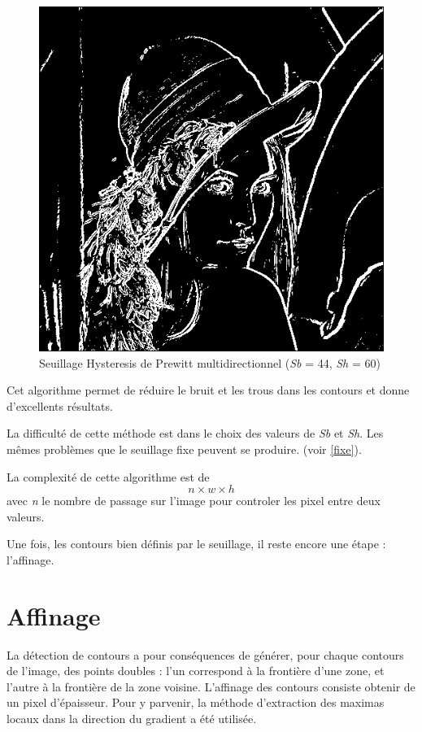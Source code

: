 \documentclass[11pt]{article}
\begin{document}
	\begin{figure}[H]
		\centering
		\includegraphics[scale=0.25]{Image/seuilHysteresis.png}
		\caption{Seuillage Hysteresis de Prewitt multidirectionnel	(\textit{Sb} = 44, \textit{Sh} = 60)}
		\label{fig:seuilHysteresis}
	\end{figure} 



	Cet algorithme permet de réduire le bruit et les trous dans les contours et donne d'excellents résultats.

	La difficulté de cette méthode est dans le choix des valeurs de \textit{Sb} et \textit{Sh}.
	Les mêmes problèmes que le seuillage fixe peuvent se produire. (voir \ref{fixe}).

	La complexité de cette algorithme est de \[n \times w \times h\]
	avec \textit{n} le nombre de passage sur l'image pour controler les pixel entre deux valeurs.

	Une fois, les contours bien définis par le seuillage, il reste encore une étape : l'affinage.


\section{Affinage}

	La détection de contours a pour conséquences de générer, pour chaque contours de l'image, des points doubles : l'un correspond à la frontière d'une zone, et l'autre à la frontière de la zone voisine. 
	L'affinage des contours consiste obtenir de un pixel d'épaisseur. 
	Pour y parvenir, la méthode d'extraction des maximas locaux dans la direction du gradient a été utilisée.
\end{document}
